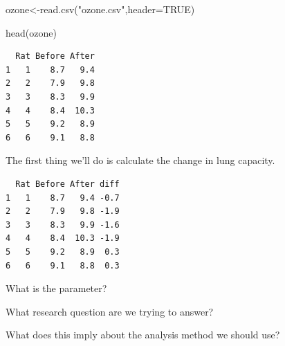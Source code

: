 \documentclass[
  letterpaper,
  DIV=11,
  numbers=noendperiod]{scrartcl}
\newenvironment{Shaded}{\begin{snugshade}}{\end{snugshade}}
\newcommand{\AttributeTok}[1]{\textcolor[rgb]{0.40,0.45,0.13}{#1}}
\newcommand{\ConstantTok}[1]{\textcolor[rgb]{0.56,0.35,0.01}{#1}}
\newcommand{\FunctionTok}[1]{\textcolor[rgb]{0.28,0.35,0.67}{#1}}
\newcommand{\NormalTok}[1]{\textcolor[rgb]{0.00,0.23,0.31}{#1}}
\newcommand{\OtherTok}[1]{\textcolor[rgb]{0.00,0.23,0.31}{#1}}
\newcommand{\SpecialCharTok}[1]{\textcolor[rgb]{0.37,0.37,0.37}{#1}}
\newcommand{\StringTok}[1]{\textcolor[rgb]{0.13,0.47,0.30}{#1}}
\begin{document}
\begin{Shaded}
\begin{Highlighting}[]
\NormalTok{ozone}\OtherTok{\textless{}{-}}\FunctionTok{read.csv}\NormalTok{(}\StringTok{"ozone.csv"}\NormalTok{,}\AttributeTok{header=}\ConstantTok{TRUE}\NormalTok{)}

\FunctionTok{head}\NormalTok{(ozone)}
\end{Highlighting}
\end{Shaded}

\begin{verbatim}
  Rat Before After
1   1    8.7   9.4
2   2    7.9   9.8
3   3    8.3   9.9
4   4    8.4  10.3
5   5    9.2   8.9
6   6    9.1   8.8
\end{verbatim}

The first thing we'll do is calculate the change in lung capacity.

\begin{Shaded}
\end{Shaded}

\begin{verbatim}
  Rat Before After diff
1   1    8.7   9.4 -0.7
2   2    7.9   9.8 -1.9
3   3    8.3   9.9 -1.6
4   4    8.4  10.3 -1.9
5   5    9.2   8.9  0.3
6   6    9.1   8.8  0.3
\end{verbatim}

What is the parameter?

\hfill\break
\hfill\break
\hfill\break

What research question are we trying to answer?

\hfill\break
\hfill\break
\hfill\break

What does this imply about the analysis method we should use?

\hfill\break
\hfill\break
\hfill\break
\hfill\break
\hfill\break

\begin{Shaded}
\end{Shaded}
\end{document}
